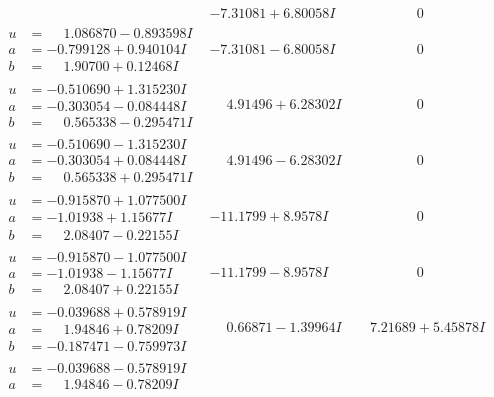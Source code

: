 \documentclass[1p]{elsarticle_modified}
\theoremstyle{definition}
\begin{document}
$$\begin{array}{c|c|c}
 & -7.31081 + 6.80058 I & \phantom{-0.000000 } 0 \\ \hline\begin{aligned}
u &= \phantom{-}1.086870 - 0.893598 I \\
a &= -0.799128 + 0.940104 I \\
b &= \phantom{-}1.90700 + 0.12468 I\end{aligned}
 & -7.31081 - 6.80058 I & \phantom{-0.000000 } 0 \\ \hline\begin{aligned}
u &= -0.510690 + 1.315230 I \\
a &= -0.303054 - 0.084448 I \\
b &= \phantom{-}0.565338 - 0.295471 I\end{aligned}
 & \phantom{-}4.91496 + 6.28302 I & \phantom{-0.000000 } 0 \\ \hline\begin{aligned}
u &= -0.510690 - 1.315230 I \\
a &= -0.303054 + 0.084448 I \\
b &= \phantom{-}0.565338 + 0.295471 I\end{aligned}
 & \phantom{-}4.91496 - 6.28302 I & \phantom{-0.000000 } 0 \\ \hline\begin{aligned}
u &= -0.915870 + 1.077500 I \\
a &= -1.01938 + 1.15677 I \\
b &= \phantom{-}2.08407 - 0.22155 I\end{aligned}
 & -11.1799 + 8.9578 I & \phantom{-0.000000 } 0 \\ \hline\begin{aligned}
u &= -0.915870 - 1.077500 I \\
a &= -1.01938 - 1.15677 I \\
b &= \phantom{-}2.08407 + 0.22155 I\end{aligned}
 & -11.1799 - 8.9578 I & \phantom{-0.000000 } 0 \\ \hline\begin{aligned}
u &= -0.039688 + 0.578919 I \\
a &= \phantom{-}1.94846 + 0.78209 I \\
b &= -0.187471 - 0.759973 I\end{aligned}
 & \phantom{-}0.66871 - 1.39964 I & \phantom{-}7.21689 + 5.45878 I \\ \hline\begin{aligned}
u &= -0.039688 - 0.578919 I \\
a &= \phantom{-}1.94846 - 0.78209 I \\

\end{aligned}
\end{array}$$
\end{document}
